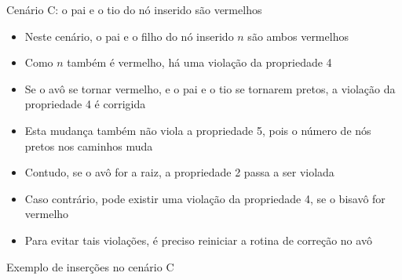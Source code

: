 \begin{frame}[fragile]{Cenário C: o pai e o tio do nó inserido são vermelhos}

    \begin{itemize}
        \item Neste cenário, o pai e o filho do nó inserido $n$ são ambos vermelhos

        \item Como $n$ também é vermelho, há uma violação da propriedade 4

        \item Se o avô se tornar vermelho, e o pai e o tio se tornarem pretos, a violação da
            propriedade 4 é corrigida

        \item Esta mudança também não viola a propriedade 5, pois o número de nós pretos
            nos caminhos muda

        \item Contudo, se o avô for a raiz, a propriedade 2 passa a ser violada

        \item Caso contrário, pode existir uma violação da propriedade 4, se o bisavô for
            vermelho

        \item Para evitar tais violações, é preciso reiniciar a rotina de correção no avô
    \end{itemize}

\end{frame}

\begin{frame}[fragile]{Exemplo de inserções no cenário C}


\end{frame}

